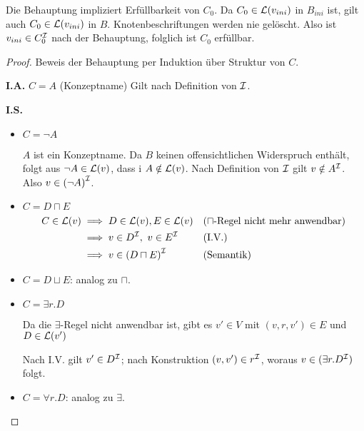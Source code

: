 \begin{tafel}
        Die Behauptung impliziert Erfüllbarkeit von $C_0$. Da $C_0 \in \mathcal{L}(v_{ini})$ in $B_{ini}$ ist, gilt auch $C_0 \in \mathcal{L}(v_{ini})$ in $B$. Knotenbeschriftungen werden nie gelöscht. Also ist $v_{ini} \in C_0^{\mathcal{I}}$ nach der Behauptung, folglich ist $C_0$ erfüllbar.
    \begin{proof}
        Beweis der Behauptung per Induktion über Struktur von $C$.
        
        \textbf{I.A.} $C = A$ (Konzeptname) Gilt nach Definition von
        $\mathcal{I}$.
        
        \textbf{I.S.}

\begin{itemize}
\item $C = \neg A$

$A$ ist ein Konzeptname. Da $B$ keinen offensichtlichen Widerspruch enthält,
folgt aus $\neg A \in \mathcal{L}(v)$, dass i $A \notin \mathcal{L}(v)$. Nach Definition von
$\mathcal{I}$ gilt $v \notin A^{\mathcal{I}}$. Also $v \in \left( \neg A \right)^\MI$.

\item $C = D \sqcap E$
    \begin{align*}
        C \in \ML(v)
        &\implies D \in \ML(v), E \in \ML(v) && \text{($\sqcap$-Regel nicht mehr anwendbar)}\\
        &\implies v \in D^\MI,\ v \in E^\MI && \text{(I.V.)}\\
        &\implies  v \in \left( D \sqcap E \right)^\MI && (\text{Semantik})
    \end{align*}

\item $C = D \sqcup E$: analog zu $\sqcap$.

\item $C = \exists r.D$

Da die $\exists$-Regel nicht anwendbar ist, gibt es $v'\in V$ mit $(v,r,v')
\in E$ und $D \in \mathcal{L}(v')$

Nach I.V. gilt $v' \in D^{\mathcal{I}}$; nach Konstruktion $(v,v') \in r^{\mathcal{I}}$, woraus
$v \in (\exists r.D^{\mathcal{I}})$ folgt.

\item $C = \forall r.D$: analog zu $\exists$.
\end{itemize}
    \end{proof}
\end{tafel}

